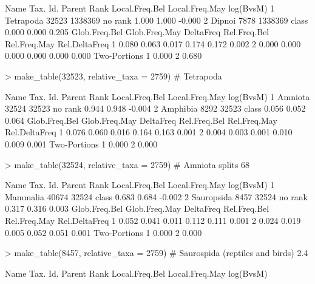 \documentclass{article}
\begin{document}
\begin{Schunk}
\begin{Sinput}
\end{Sinput}
\begin{Soutput}
       Name Tax. Id.  Parent    Rank Local.Freq.Bel Local.Freq.May log(BvsM)
1 Tetrapoda    32523 1338369 no rank          1.000          1.000    -0.000
2    Dipnoi     7878 1338369   class          0.000          0.000     0.205
  Glob.Freq.Bel Glob.Freq.May DeltaFreq Rel.Freq.Bel Rel.Freq.May Rel.DeltaFreq
1         0.080         0.063     0.017        0.174        0.172         0.002
2         0.000         0.000     0.000        0.000        0.000         0.000
  Two-Portions
1        0.000
2        0.680
\end{Soutput}
\begin{Sinput}
> make_table(32523, relative_taxa = 2759) # Tetrapoda
\end{Sinput}
\begin{Soutput}
      Name Tax. Id. Parent    Rank Local.Freq.Bel Local.Freq.May log(BvsM)
1  Amniota    32524  32523 no rank          0.944          0.948    -0.004
2 Amphibia     8292  32523   class          0.056          0.052     0.064
  Glob.Freq.Bel Glob.Freq.May DeltaFreq Rel.Freq.Bel Rel.Freq.May Rel.DeltaFreq
1         0.076         0.060     0.016        0.164        0.163         0.001
2         0.004         0.003     0.001        0.010        0.009         0.001
  Two-Portions
1        0.000
2        0.000
\end{Soutput}
\begin{Sinput}
> make_table(32524, relative_taxa = 2759) # Amniota  splits 68%/32% Mammalia and Sarospida
\end{Sinput}
\begin{Soutput}
        Name Tax. Id. Parent    Rank Local.Freq.Bel Local.Freq.May log(BvsM)
1   Mammalia    40674  32524   class          0.683          0.684    -0.002
2 Sauropsida     8457  32524 no rank          0.317          0.316     0.003
  Glob.Freq.Bel Glob.Freq.May DeltaFreq Rel.Freq.Bel Rel.Freq.May Rel.DeltaFreq
1         0.052         0.041     0.011        0.112        0.111         0.001
2         0.024         0.019     0.005        0.052        0.051         0.001
  Two-Portions
1        0.000
2        0.000
\end{Soutput}
\begin{Sinput}
> make_table(8457, relative_taxa = 2759) # Saurospida (reptiles and birds) 2.4% B and 1.9% M of all reads
\end{Sinput}
\begin{Soutput}
    Name Tax. Id. Parent    Rank Local.Freq.Bel Local.Freq.May log(BvsM)

\end{Soutput}
\end{Schunk}
\end{document}
